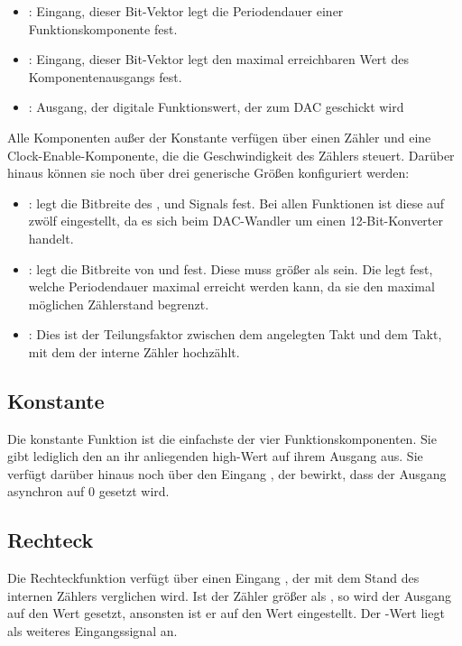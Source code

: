 \begin{itemize}
\item {}: Eingang, dieser Bit-Vektor legt die Periodendauer einer Funktionskomponente fest.
\item {}: Eingang, dieser Bit-Vektor legt den maximal erreichbaren Wert des Komponentenausgangs fest.
\item {}: Ausgang, der digitale Funktionswert, der zum DAC geschickt wird
\end{itemize}

Alle Komponenten außer der Konstante verfügen über einen Zähler und eine Clock-Enable-Komponente, die die Geschwindigkeit des Zählers steuert.
Darüber hinaus können sie noch über drei generische Größen konfiguriert werden:

\begin{itemize}
\item {}: legt die Bitbreite des ,  und  Signals fest.
Bei allen Funktionen ist diese auf zwölf eingestellt, da es sich beim DAC-Wandler um einen 12-Bit-Konverter handelt.
\item {}: legt die Bitbreite von  und  fest.
  Diese muss größer als  sein.
  Die  legt fest, welche Periodendauer maximal erreicht werden kann, da sie den maximal möglichen Zählerstand begrenzt.
\item {}: Dies ist der Teilungsfaktor zwischen dem angelegten Takt und dem Takt, mit dem der interne Zähler hochzählt.
\end{itemize}


\subsection{Konstante}   \label{Comp:Func:Const}
Die konstante Funktion ist die einfachste der vier Funktionskomponenten.
Sie gibt lediglich den an ihr anliegenden high-Wert auf ihrem Ausgang aus.
Sie verfügt darüber hinaus noch über den Eingang , der bewirkt, dass der Ausgang asynchron auf 0 gesetzt wird.
\subsection{Rechteck}   \label{Comp:Func:Square}
Die Rechteckfunktion verfügt über einen Eingang , der mit dem Stand des internen Zählers verglichen wird.
Ist der Zähler größer als , so wird der Ausgang auf den Wert  gesetzt, ansonsten ist er auf den Wert  eingestellt.
Der -Wert liegt als weiteres Eingangssignal an.


